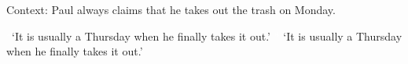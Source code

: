 
\begin{exe}
\ex Context: Paul always claims that he takes out the trash on Monday.\label{delayedaspectdgsusually}
\begin{xlist} 
\glt \textcolor{white}{*}`It is usually a Thursday when he finally takes it out.' \label{ex:delayedaspectdgsusuallya}
\glt\textcolor{white}{*} `It is usually a Thursday when he finally takes it out.' \label{ex:delayedaspectdgsusuallyb}
\end{xlist}
\end{exe}  

%
%
%
%
